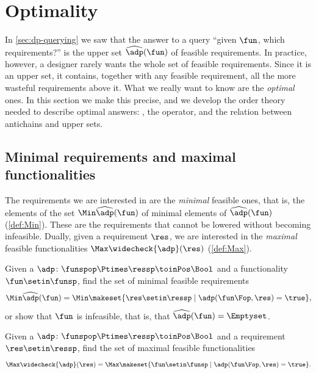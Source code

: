 

\section{Optimality}
\label{sec:dp-optimality}

In \cref{sec:dp-querying} we saw that the answer to a query ``given $\fun$, which requirements?'' is the upper set $\widehat{\adp}(\fun)$ of feasible requirements.
In practice, however, a designer rarely wants the whole set of feasible requirements.
Since it is an upper set, it contains, together with any feasible requirement, all the more wasteful requirements above it.
What we really want to know are the \emph{optimal} ones.
In this section we make this precise, and we develop the order theory needed to describe optimal answers: , the  operator, and the relation between antichains and upper sets.

\subsection{Minimal requirements and maximal functionalities}
\label{sec:dp-min-max-queries}

The requirements we are interested in are the \emph{minimal} feasible ones, that is, the elements of the set $\Min \widehat{\adp}(\fun)$ of minimal elements of $\widehat{\adp}(\fun)$ (\cref{def:Min}).
These are the requirements that cannot be lowered without becoming infeasible.
Dually, given a requirement $\res$, we are interested in the \emph{maximal} feasible functionalities $\Max \widecheck{\adp}(\res)$ (\cref{def:Max}).

\begin{problem}
    Given a  $\adp \colon \funspop \Ptimes \ressp \toinPos \Bool$ and a functionality $\fun \setin \funsp$, find the set of minimal feasible requirements
    \begin{equation}
        \Min \widehat{\adp}(\fun) = \Min \makeset{\res \setin \ressp \mid \adp(\fun\Fop, \res) = \true},
    \end{equation}
    or show that $\fun$ is infeasible, that is, that $\widehat{\adp}(\fun) = \Emptyset$.
\end{problem}

\begin{problem}
    Given a  $\adp \colon \funspop \Ptimes \ressp \toinPos \Bool$ and a requirement $\res \setin \ressp$, find the set of maximal feasible functionalities
    \begin{equation}
        \Max \widecheck{\adp}(\res) = \Max \makeset{\fun \setin \funsp \mid \adp(\fun\Fop, \res) = \true}.
    \end{equation}
\end{problem}

